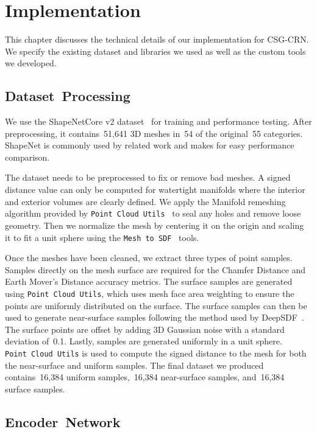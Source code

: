 
\chapter{Implementation}
\label{chap:implementation}

This chapter discusses the technical details of our implementation for CSG-CRN. We specify the existing dataset and libraries we used as well as the custom tools we developed.

\section{Dataset~Processing}
\label{sec:dataset_processing}

We use the ShapeNetCore v2 dataset~\cite{Chang2015} for training and performance testing. After preprocessing, it contains~51,641 3D meshes in~54 of the original~55 categories. ShapeNet is commonly used by related work and makes for easy performance comparison.

The dataset needs to be preprocessed to fix or remove bad meshes. A signed distance value can only be computed for watertight manifolds where the interior and exterior volumes are clearly defined. We apply the Manifold remeshing algorithm provided by \texttt{Point~Cloud~Utils}~\cite{Williams2022} to seal any holes and remove loose geometry. Then we normalize the mesh by centering it on the origin and scaling it to fit a unit sphere using the \texttt{Mesh~to~SDF}~\cite{Kleineberg2024} tools.

Once the meshes have been cleaned, we extract three types of point samples. Samples directly on the mesh surface are required for the Chamfer Distance and Earth Mover's Distance accuracy metrics. The surface samples are generated using \texttt{Point~Cloud~Utils}, which uses mesh face area weighting to ensure the points are uniformly distributed on the surface. The surface samples can then be used to generate near-surface samples following the method used by DeepSDF~\cite{Park2019}. The surface points are offset by adding 3D Gaussian noise with a standard deviation of~0.1. Lastly, samples are generated uniformly in a unit sphere. \texttt{Point~Cloud~Utils} is used to compute the signed distance to the mesh for both the near-surface and uniform samples. The final dataset we produced contains~16,384 uniform samples,~16,384 near-surface samples, and~16,384 surface samples.


\section{Encoder~Network}
\label{sec:encoder_network_implementation}

